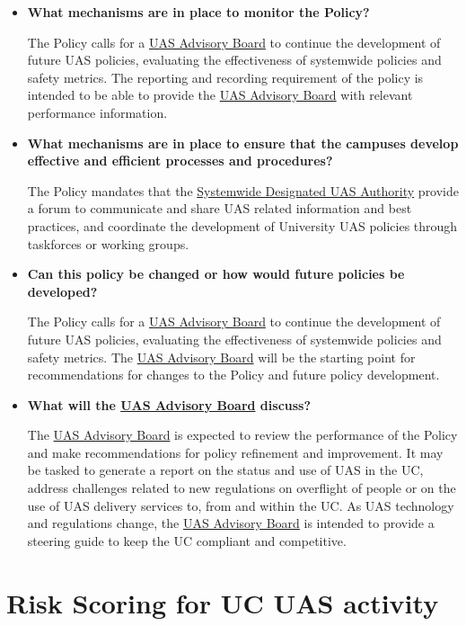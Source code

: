 \documentclass[
]{book}
\begin{document}
\begin{itemize}
\item
  \textbf{What mechanisms are in place to monitor the Policy?}

  The Policy calls for a \protect\hyperlink{AB}{UAS Advisory Board} to continue the development of future UAS policies, evaluating the effectiveness of systemwide policies and safety metrics. The reporting and recording requirement of the policy is intended to be able to provide the \protect\hyperlink{AB}{UAS Advisory Board} with relevant performance information.
\item
  \textbf{What mechanisms are in place to ensure that the campuses develop effective and efficient processes and procedures?}

  The Policy mandates that the \protect\hyperlink{SDA}{Systemwide Designated UAS Authority} provide a forum to communicate and share UAS related information and best practices, and coordinate the development of University UAS policies through taskforces or working groups.
\item
  \textbf{Can this policy be changed or how would future policies be developed?}

  The Policy calls for a \protect\hyperlink{AB}{UAS Advisory Board} to continue the development of future UAS policies, evaluating the effectiveness of systemwide policies and safety metrics. The \protect\hyperlink{AB}{UAS Advisory Board} will be the starting point for recommendations for changes to the Policy and future policy development.
\item
  \textbf{What will the \protect\hyperlink{AB}{UAS Advisory Board} discuss?}

  The \protect\hyperlink{AB}{UAS Advisory Board} is expected to review the performance of the Policy and make recommendations for policy refinement and improvement. It may be tasked to generate a report on the status and use of UAS in the UC, address challenges related to new regulations on overflight of people or on the use of UAS delivery services to, from and within the UC. As UAS technology and regulations change, the \protect\hyperlink{AB}{UAS Advisory Board} is intended to provide a steering guide to keep the UC compliant and competitive.
\end{itemize}

\hypertarget{ch-risk-score}{%
\chapter{Risk Scoring for UC UAS activity}\label{ch-risk-score}}
\end{document}
